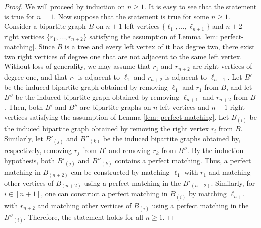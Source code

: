 \documentclass[12pt,reqno]{article}%
\theoremstyle{definition}
\numberwithin{equation}{section}
\begin{document}
\begin{proof} We will proceed by induction on $n \geq 1.$ It is easy to see that the statement is true for $n = 1$.  Now suppose that the statement is true for some $n \geq 1.$ Consider a bipartite graph $B$ on $n+1$ left vertices $\{\ell_1, \dots, \ell_{n+1}\}$ and $n+2$ right vertices $\{r_1, \dots, r_{n+2}\}$ satisfying the assumption of Lemma \ref{lem: perfect-matching}. Since $B$ is a tree and every left vertex of it has degree two, there exist two right vertices of degree one that are not adjacent to the same left vertex. Without loss of generality, we may assume that $r_1$ and $r_{n+2}$ are right vertices of degree one, and that $r_1$ is adjacent to $\ell_1$ and $r_{n+2}$ is adjacent to $\ell_{n+1}$. Let $B'$ be the induced bipartite graph obtained by removing $\ell_{1}$ and $r_{1}$ from $B$, and let $B''$ be the induced bipartite graph obtained by removing $\ell_{n+1}$ and $r_{n+2}$ from $B$. Then, both $B'$ and $B''$ are bipartite graphs on $n$ left vertices and $n+1$ right vertices satisfying the assumption of Lemma \ref{lem: perfect-matching}. Let $B_{(i)}$ be the induced bipartite graph obtained by removing the right vertex $r_i$ from $B$. Similarly, let $B'_{(j)}$ and $B''_{(k)}$ be the induced bipartite graphs obtained by, respectively, removing $r_j$ from $B'$ and removing $r_k$ from $B''$. By the induction hypothesis, both $B'_{(j)}$ and $B''_{(k)}$ contains a perfect matching. Thus, a perfect matching in $B_{(n+2)}$ can be constructed by matching $\ell_1$ with $r_1$ and matching other vertices of $B_{(n+2)}$ using a perfect matching in the $B'_{(n+2)}$. Similarly, for $i \in [n+1]$, one can construct a perfect matching in $B_{(i)}$ by matching $\ell_{n+1}$ with $r_{n+2}$ and matching other vertices of $B_{(i)}$ using a perfect matching in the $B''_{(i)}$. Therefore, the statement holds for all $n \geq 1.$
\end{proof}
\end{document}
